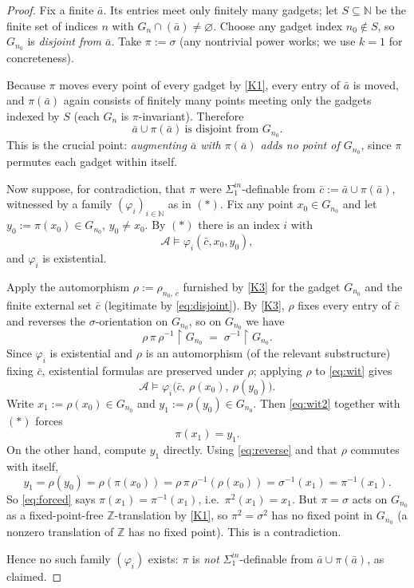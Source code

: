 \documentclass[12pt,fullpage]{article}
\theoremstyle{definition}
\newcommand{\A}{\mathcal{A}}
\newcommand{\N}{\mathbb{N}}
\newcommand{\Z}{{\mathbb{Z}}}
\renewcommand{\phi}{\varphi}
\begin{document}
\begin{proof}
Fix a finite $\bar a$.  Its entries meet only finitely many gadgets; let
$S\subseteq\N$ be the finite set of indices $n$ with
$G_n\cap(\bar a)\neq\varnothing$.  Choose any gadget index $n_0\notin S$, so
$G_{n_0}$ is \emph{disjoint from $\bar a$}.  Take $\pi:=\sigma$
(any nontrivial power works; we use $k=1$ for concreteness).

Because $\pi$ moves every point of every gadget by \ref{K1}, every entry of
$\bar a$ is moved, and $\pi(\bar a)$ again consists of finitely many points
meeting only the gadgets indexed by $S$ (each $G_n$ is $\pi$-invariant).
Therefore
\[
\bar a\cup\pi(\bar a)\ \text{is disjoint from } G_{n_0}.
\tag{1}\label{eq:disjoint}
\]
This is the crucial point: \emph{augmenting $\bar a$ with $\pi(\bar a)$ adds
no point of $G_{n_0}$}, since $\pi$ permutes each gadget within itself.

Now suppose, for contradiction, that $\pi$ were $\Sigma^{in}_1$-definable
from $\bar c:=\bar a\cup\pi(\bar a)$, witnessed by a family
$(\phi_i)_{i\in\N}$ as in $(\ast)$.  Fix any point $x_0\in G_{n_0}$ and let
$y_0:=\pi(x_0)\in G_{n_0}$, $y_0\neq x_0$.  By $(\ast)$ there is an index $i$
with
\[
\A\models\phi_i(\bar c,x_0,y_0),
\tag{2}\label{eq:wit}
\]
and $\phi_i$ is existential.

Apply the automorphism $\rho:=\rho_{n_0,\,\bar c}$ furnished by \ref{K3} for
the gadget $G_{n_0}$ and the finite external set $\bar c$ (legitimate by
\eqref{eq:disjoint}).  By \ref{K3}, $\rho$ fixes every entry of $\bar c$ and
reverses the $\sigma$-orientation on $G_{n_0}$, so on $G_{n_0}$ we have
\[
\rho\,\pi\,\rho^{-1}\restriction G_{n_0}\;=\;\sigma^{-1}\restriction G_{n_0}.
\tag{3}\label{eq:reverse}
\]
Since $\phi_i$ is existential and $\rho$ is an automorphism (of the relevant
substructure) fixing $\bar c$, existential formulas are preserved under
$\rho$; applying $\rho$ to \eqref{eq:wit} gives
\[
\A\models\phi_i\bigl(\bar c,\ \rho(x_0),\ \rho(y_0)\bigr).
\tag{4}\label{eq:wit2}
\]
Write $x_1:=\rho(x_0)\in G_{n_0}$ and $y_1:=\rho(y_0)\in G_{n_0}$.  Then
\eqref{eq:wit2} together with $(\ast)$ forces
\[
\pi(x_1)=y_1.
\tag{5}\label{eq:forced}
\]
On the other hand, compute $y_1$ directly.  Using \eqref{eq:reverse} and that
$\rho$ commutes with itself,
\[
y_1=\rho(y_0)=\rho(\pi(x_0))=\rho\,\pi\,\rho^{-1}(\rho(x_0))
=\sigma^{-1}(x_1)=\pi^{-1}(x_1).
\]
So \eqref{eq:forced} says $\pi(x_1)=\pi^{-1}(x_1)$, i.e.\
$\pi^2(x_1)=x_1$.  But $\pi=\sigma$ acts on $G_{n_0}$ as a fixed-point-free
$\Z$-translation by \ref{K1}, so $\pi^2=\sigma^2$ has no fixed point in
$G_{n_0}$ (a nonzero translation of $\Z$ has no fixed point).  This is a
contradiction.

Hence no such family $(\phi_i)$ exists: $\pi$ is \emph{not}
$\Sigma^{in}_1$-definable from $\bar a\cup\pi(\bar a)$, as claimed.
\end{proof}
\end{document}
